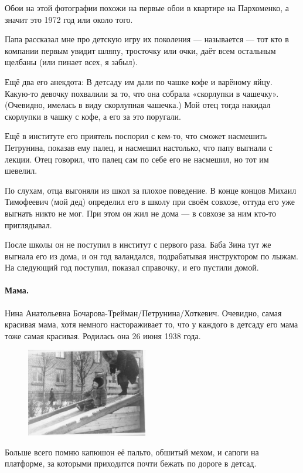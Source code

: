 \documentclass{book}
\begin{document}
Обои на этой фотографии похожи на первые обои в квартире на Пархоменко, а значит это 1972 год или около того.

Папа рассказал мне про детскую игру их поколения --- называется  --- тот кто в компании первым увидит шляпу, тросточку или очки, даёт всем остальным щелбаны (или пинает всех, я забыл).

Ещё два его анекдота:
В детсаду им дали по чашке кофе и варёному яйцу.
Какую-то девочку похвалили за то, что она собрала «скорлупки в чашечку».
(Очевидно, имелась в виду скорлупная чашечка.)
Мой отец тогда накидал скорлупки в чашку с кофе, а его за это поругали.

Ещё в институте его приятель поспорил с кем-то, что сможет насмешить Петрунина, показав ему палец, и насмешил настолько, что папу выгнали с лекции.
Отец говорил, что палец сам по себе его не насмешил, но тот им шевелил.

По слухам, отца выгоняли из школ за плохое поведение.
В конце концов Михаил Тимофеевич (мой дед) определил его в школу при своём совхозе, оттуда его уже выгнать никто не мог.
При этом он жил не дома --- в совхозе за ним кто-то приглядывал.

После школы он не поступил в институт с первого раза.
Баба Зина тут же выгнала его из дома, и он год валандался, подрабатывая инструктором по лыжам.
На следующий год поступил, показал справочку, и его пустили домой.

\paragraph{Мама.}  Нина Анатольевна Бочарова-Трейман/Петрунина/Хоткевич.
Очевидно, самая красивая мама,
хотя немного настораживает то, что у каждого в детсаду его мама тоже самая красивая.
Родилась она 26 июня 1938 года.


\begin{figure}
\vskip-0mm
\centering
\includegraphics[width=53mm,angle=0]{pics/tosha-mama-detsad}
\end{figure}

Больше всего помню капюшон её пальто, обшитый мехом, и 
сапоги на платформе, за которыми приходится почти бежать по дороге в детсад.
\end{document}
